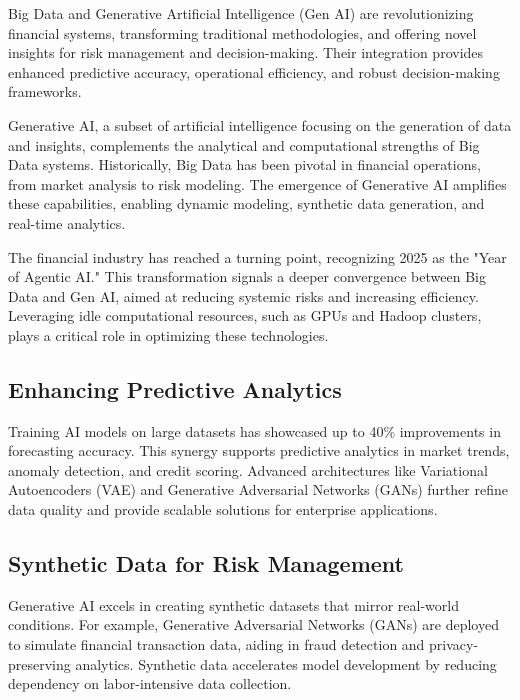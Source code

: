 \documentclass[a4paper,headinclude=on,footinclude=on,12pt,oneside]{scrbook}
\begin{document}
	Big Data and Generative Artificial Intelligence (Gen AI) are revolutionizing financial systems, transforming traditional methodologies, and offering novel insights for risk management and decision-making. Their integration provides enhanced predictive accuracy, operational efficiency, and robust decision-making frameworks.
	
	Generative AI, a subset of artificial intelligence focusing on the generation of data and insights, complements the analytical and computational strengths of Big Data systems. Historically, Big Data has been pivotal in financial operations, from market analysis to risk modeling. The emergence of Generative AI amplifies these capabilities, enabling dynamic modeling, synthetic data generation, and real-time analytics.
	
	The financial industry has reached a turning point, recognizing 2025 as the "Year of Agentic AI." This transformation signals a deeper convergence between Big Data and Gen AI, aimed at reducing systemic risks and increasing efficiency. Leveraging idle computational resources, such as GPUs and Hadoop clusters, plays a critical role in optimizing these technologies.
	
	
	\subsection{Enhancing Predictive Analytics}
	Training AI models on large datasets has showcased up to 40\% improvements in forecasting accuracy. This synergy supports predictive analytics in market trends, anomaly detection, and credit scoring. Advanced architectures like Variational Autoencoders (VAE) and Generative Adversarial Networks (GANs) further refine data quality and provide scalable solutions for enterprise applications.
	
	\subsection{Synthetic Data for Risk Management}
	Generative AI excels in creating synthetic datasets that mirror real-world conditions. For example, Generative Adversarial Networks (GANs) are deployed to simulate financial transaction data, aiding in fraud detection and privacy-preserving analytics. Synthetic data accelerates model development by reducing dependency on labor-intensive data collection.
	
\end{document}

